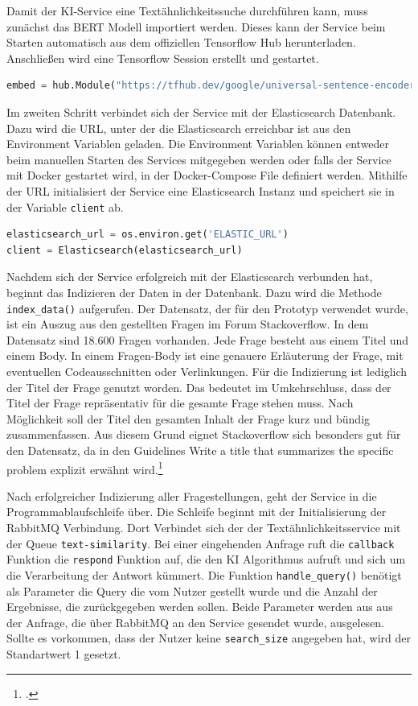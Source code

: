 Damit der KI-Service eine Textähnlichkeitssuche durchführen kann, muss zunächst das BERT Modell importiert werden. Dieses kann der Service beim Starten automatisch aus dem offiziellen Tensorflow Hub herunterladen. Anschließen wird eine Tensorflow Session erstellt und gestartet. 

\begin{lstlisting}[language=Python]
embed = hub.Module("https://tfhub.dev/google/universal-sentence-encoder/2")
\end{lstlisting}

Im zweiten Schritt verbindet sich der Service mit der Elasticsearch Datenbank. Dazu wird die URL, unter der die Elasticsearch erreichbar ist aus den Environment Variablen geladen. Die Environment Variablen können entweder beim manuellen Starten des Services mitgegeben werden oder falls der Service mit Docker gestartet wird, in der Docker-Compose File definiert werden. Mithilfe der URL initialisiert der Service eine Elasticsearch Instanz und speichert sie in der Variable \texttt{client} ab. 

\begin{lstlisting}[language=Python]
elasticsearch_url = os.environ.get('ELASTIC_URL')
client = Elasticsearch(elasticsearch_url)
\end{lstlisting}

Nachdem sich der Service erfolgreich mit der Elasticsearch verbunden hat, beginnt das Indizieren der Daten in der Datenbank. Dazu wird die Methode \texttt{index\_{}data()} aufgerufen. Der Datensatz, der für den Prototyp verwendet wurde, ist ein Auszug aus den gestellten Fragen im Forum Stackoverflow. In dem Datensatz sind 18.600 Fragen vorhanden. Jede Frage besteht aus einem Titel und einem Body. In einem Fragen-Body ist eine genauere Erläuterung der Frage, mit eventuellen Codeausschnitten oder Verlinkungen. Für die Indizierung ist lediglich der Titel der Frage genutzt worden. Das bedeutet im Umkehrschluss, dass der Titel der Frage repräsentativ für die gesamte Frage stehen muss. Nach Möglichkeit soll der Titel den gesamten Inhalt der Frage kurz und bündig zusammenfassen. Aus diesem Grund eignet  Stackoverflow sich besonders gut für den Datensatz, da in den Guidelines \glqq Write a title that summarizes the specific problem\grqq{} explizit erwähnt wird.\footcite{stackoverflow2022question}

Nach erfolgreicher Indizierung aller Fragestellungen, geht der Service in die Programmablaufschleife über. Die Schleife beginnt mit der Initialisierung der RabbitMQ Verbindung. Dort Verbindet sich der der Textähnlichkeitsservice mit der Queue \texttt{text-similarity}. Bei einer eingehenden Anfrage ruft die \texttt{callback} Funktion die \texttt{respond} Funktion auf, die den KI Algorithmus aufruft und sich um die Verarbeitung der Antwort kümmert. Die Funktion \texttt{handle\_{}query()} benötigt als Parameter die Query die vom Nutzer gestellt wurde und die Anzahl der Ergebnisse, die zurückgegeben werden sollen. Beide Parameter werden aus aus der Anfrage, die über RabbitMQ an den Service gesendet wurde, ausgelesen. Sollte es vorkommen, dass der Nutzer keine \texttt{search\_{}size} angegeben hat, wird der Standartwert 1 gesetzt.
 
